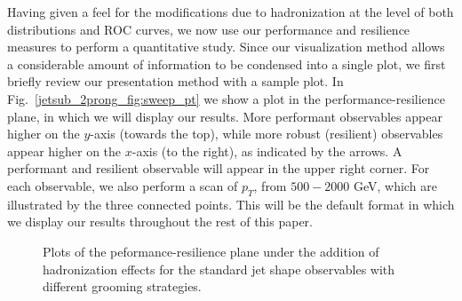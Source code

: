 \documentclass[11pt]{cernrep}
\begin{document}
Having given a feel for the modifications due to hadronization at the level of both distributions and ROC curves, we now use our performance and resilience measures to perform a quantitative study.
%
Since our visualization method allows a considerable amount of information to be condensed into a single plot, we first briefly review our presentation method with a sample plot.
%
In Fig.~\ref{jetsub_2prong_fig:sweep_pt} we show a plot in the performance-resilience plane, in which we will display our results.
%
More performant observables appear higher on the $y$-axis (towards the top), while more robust (resilient) observables appear higher on the $x$-axis (to the right), as indicated by the arrows.
%
A performant and resilient observable will appear in the upper right corner.
%
For each observable, we also perform a scan of $p_T$, from $500-2000$ GeV, which are illustrated by the three connected points.
%
This will be the default format in which we display our results throughout the rest of this paper.


\begin{figure}
  \caption{Plots of the peformance-resilience plane under the addition of hadronization effects for the standard jet shape observables with different grooming strategies.}\label{jetsub_2prong_fig:grooming-hadronisation}
\end{figure}
\end{document}
